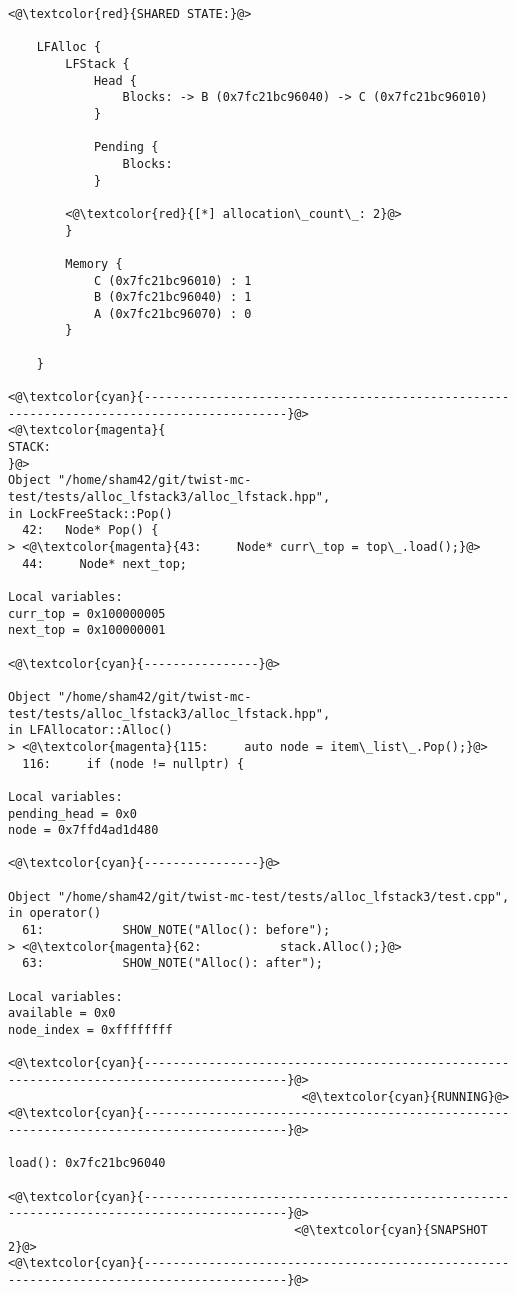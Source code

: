 \begin{adjustwidth}{-3.3cm}{-1cm}
\begin{allintypewriter}
\begin{multicols*}{2}
\begin{lstlisting}[numbers=none]
<@\textcolor{red}{SHARED STATE:}@>

    LFAlloc {
	    LFStack {
		    Head {
			    Blocks: -> B (0x7fc21bc96040) -> C (0x7fc21bc96010) 
		    }

		    Pending {
			    Blocks: 
		    }

		<@\textcolor{red}{[*] allocation\_count\_: 2}@>
	    }

	    Memory {
		    C (0x7fc21bc96010) : 1
		    B (0x7fc21bc96040) : 1
		    A (0x7fc21bc96070) : 0
	    }

    }

<@\textcolor{cyan}{------------------------------------------------------------------------------------------}@>
<@\textcolor{magenta}{
STACK:
}@>
Object "/home/sham42/git/twist-mc-test/tests/alloc_lfstack3/alloc_lfstack.hpp",
in LockFreeStack::Pop()
  42:   Node* Pop() {
> <@\textcolor{magenta}{43:     Node* curr\_top = top\_.load();}@>
  44:     Node* next_top;

Local variables: 
curr_top = 0x100000005
next_top = 0x100000001

<@\textcolor{cyan}{----------------}@>

Object "/home/sham42/git/twist-mc-test/tests/alloc_lfstack3/alloc_lfstack.hpp",
in LFAllocator::Alloc()
> <@\textcolor{magenta}{115:     auto node = item\_list\_.Pop();}@>
  116:     if (node != nullptr) {

Local variables: 
pending_head = 0x0
node = 0x7ffd4ad1d480

<@\textcolor{cyan}{----------------}@>

Object "/home/sham42/git/twist-mc-test/tests/alloc_lfstack3/test.cpp",
in operator()
  61:           SHOW_NOTE("Alloc(): before");
> <@\textcolor{magenta}{62:           stack.Alloc();}@>
  63:           SHOW_NOTE("Alloc(): after");

Local variables: 
available = 0x0
node_index = 0xffffffff

<@\textcolor{cyan}{------------------------------------------------------------------------------------------}@>
                                         <@\textcolor{cyan}{RUNNING}@>
<@\textcolor{cyan}{------------------------------------------------------------------------------------------}@>

load(): 0x7fc21bc96040

<@\textcolor{cyan}{------------------------------------------------------------------------------------------}@>
                                        <@\textcolor{cyan}{SNAPSHOT 2}@>
<@\textcolor{cyan}{------------------------------------------------------------------------------------------}@>


\end{lstlisting}
\end{multicols*}
\end{allintypewriter}
\end{adjustwidth}

